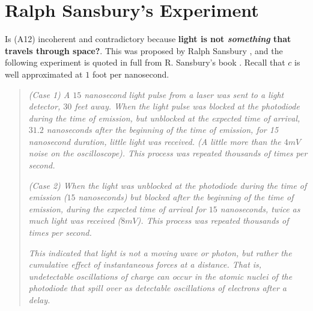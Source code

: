 \documentclass[12pt]{amsart}
\theoremstyle{definition}
\theoremstyle{remark}
\begin{document}







\section{Ralph Sansbury's Experiment}
Is (A12) incoherent and contradictory because \textbf{light is not \emph{something} that travels through space?}. This was proposed by Ralph Sansbury \cite{sansburylight}, and the following experiment is quoted in full from R. Sansbury's book \cite{sansburyspeed}. Recall that $c$ is well approximated at $1$ foot per nanosecond.


\begin{quote}
\emph{ (Case 1) A $15$ nanosecond light pulse from a laser was sent to a light detector, $30$ feet away. When the light pulse was blocked at the photodiode during the time of emission, but unblocked at the expected time of arrival, $31.2$ nanoseconds after the beginning of the time of emission, for 15 nanosecond duration, little light was received. (A little more than the $4mV$ noise on the oscilloscope). This process was repeated thousands of times per second.}

\emph{(Case 2) When the light was unblocked at the photodiode during the time of emission ($15$ nanoseconds) but blocked after the beginning of the time of emission, during the expected time of arrival for $15$ nanoseconds, twice as much light was received ($8mV$). This process was repeated thousands of times per second.}

\emph{This indicated that light is not a moving wave or photon, but rather the cumulative effect of instantaneous forces at a distance. That is, undetectable oscillations of charge can occur in the atomic nuclei of the photodiode that spill over as detectable oscillations of electrons after a delay.}
\end{quote}
\end{document}
